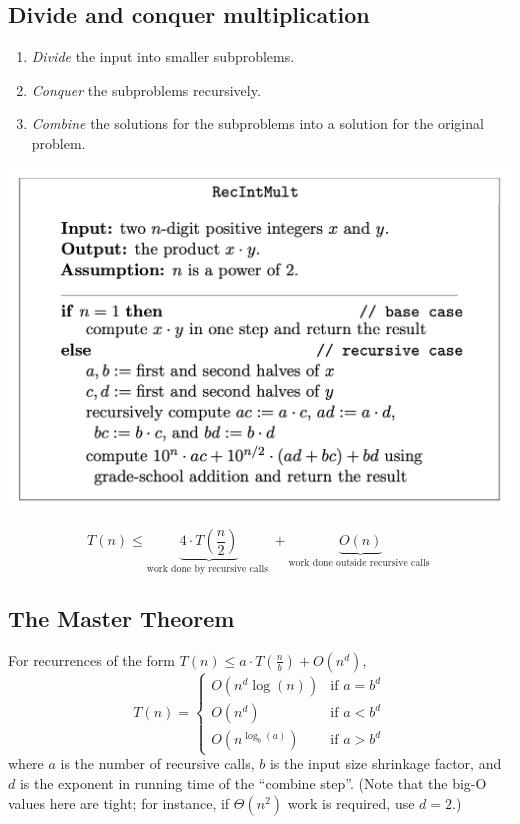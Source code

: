 \documentclass[12pt]{article}
\begin{document}
\subsection*{Divide and conquer multiplication}
\begin{mdframed}
\begin{enumerate}
    \item \textit{Divide} the input into smaller subproblems.
    \item \textit{Conquer} the subproblems recursively.
    \item \textit{Combine} the solutions for the subproblems into a solution for the original problem. 
\end{enumerate}
\end{mdframed}
\begin{center}
\includegraphics[scale=0.5]{recintmult.png} 
\\
\end{center}
$$T(n) \leq \underbrace{4 \cdot T\left(\frac{n}{2}\right)}_{\text {work done by recursive calls }}+\underbrace{O(n)}_{\text {work done outside recursive calls }}$$
\subsection*{The Master Theorem}
For recurrences of the form $T(n) \leq a \cdot T\left(\frac{n}{b}\right)+O\left(n^{d}\right)$,
\[
    T(n) =
    \begin{cases}
    O(n^d \log(n)) & \text{if } a = b^d\\
    O(n^d) & \text{if } a < b^d\\
    O(n^{\log_b(a)}) & \text{if } a > b^d
    \end{cases}
    \]
    where $a$ is the number of recursive calls, $b$ is the input size shrinkage factor, and $d$ is the exponent in running time of the “combine step”. (Note that the big-O values here are tight; for instance, if $\Theta(n^2)$ work is required, use $d = 2$.)
\newpage
\end{document}

